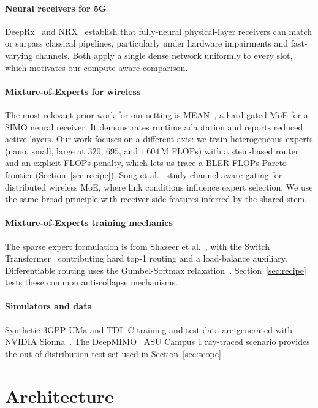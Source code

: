 \paragraph{Neural receivers for 5G}
DeepRx~\cite{honkala2021deeprx} and NRX~\cite{wiesmayr2024nrx} establish that fully-neural physical-layer receivers can match or surpass classical pipelines, particularly under hardware impairments and fast-varying channels. Both apply a single dense network uniformly to every slot, which motivates our compute-aware comparison.

\paragraph{Mixture-of-Experts for wireless}
The most relevant prior work for our setting is MEAN~\cite{vanbolderik2024mean}, a hard-gated MoE for a SIMO neural receiver. It demonstrates runtime adaptation and reports reduced active layers. Our work focuses on a different axis: we train heterogeneous experts (nano, small, large at $320$, $695$, and $1\,604$\,M FLOPs) with a stem-based router and an explicit FLOPs penalty, which lets us trace a BLER-FLOPs Pareto frontier (Section~\ref{sec:recipe}). Song et al.~\cite{song2025channelaware} study channel-aware gating for distributed wireless MoE, where link conditions influence expert selection. We use the same broad principle with receiver-side features inferred by the shared stem.

\paragraph{Mixture-of-Experts training mechanics}
The sparse expert formulation is from Shazeer et al.~\cite{shazeer2017outrageously}, with the Switch Transformer~\cite{fedus2022switch} contributing hard top-1 routing and a load-balance auxiliary. Differentiable routing uses the Gumbel-Softmax relaxation~\cite{jang2017gumbel}. Section~\ref{sec:recipe} tests these common anti-collapse mechanisms.

\paragraph{Simulators and data}
Synthetic 3GPP UMa and TDL-C training and test data are generated with NVIDIA Sionna~\cite{sionna}. The DeepMIMO~\cite{deepmimo} ASU Campus 1 ray-traced scenario provides the out-of-distribution test set used in Section~\ref{sec:scope}.

\section{Architecture}
\label{sec:arch}

